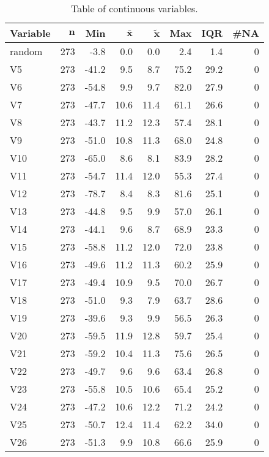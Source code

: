{\footnotesize
\begin{longtable}{lrrrrrrr}
\caption{Table of continuous variables.} \\ 
 \textbf{Variable} & $\mathbf{n}$ & \textbf{Min} & $\mathbf{\bar{x}}$ & $\mathbf{\widetilde{x}}$ & \textbf{Max} & \textbf{IQR} & \textbf{\#NA} \\ 
  \hline \endhead  \hline
random & 273 &  -3.8 &  0.0 &  0.0 &   2.4 &  1.4 & 0 \\ 
  V5 & 273 & -41.2 &  9.5 &  8.7 &  75.2 & 29.2 & 0 \\ 
  V6 & 273 & -54.8 &  9.9 &  9.7 &  82.0 & 27.9 & 0 \\ 
  V7 & 273 & -47.7 & 10.6 & 11.4 &  61.1 & 26.6 & 0 \\ 
  V8 & 273 & -43.7 & 11.2 & 12.3 &  57.4 & 28.1 & 0 \\ 
  V9 & 273 & -51.0 & 10.8 & 11.3 &  68.0 & 24.8 & 0 \\ 
  V10 & 273 & -65.0 &  8.6 &  8.1 &  83.9 & 28.2 & 0 \\ 
  V11 & 273 & -54.7 & 11.4 & 12.0 &  55.3 & 27.4 & 0 \\ 
  V12 & 273 & -78.7 &  8.4 &  8.3 &  81.6 & 25.1 & 0 \\ 
  V13 & 273 & -44.8 &  9.5 &  9.9 &  57.0 & 26.1 & 0 \\ 
  V14 & 273 & -44.1 &  9.6 &  8.7 &  68.9 & 23.3 & 0 \\ 
  V15 & 273 & -58.8 & 11.2 & 12.0 &  72.0 & 23.8 & 0 \\ 
  V16 & 273 & -49.6 & 11.2 & 11.3 &  60.2 & 25.9 & 0 \\ 
  V17 & 273 & -49.4 & 10.9 &  9.5 &  70.0 & 26.7 & 0 \\ 
  V18 & 273 & -51.0 &  9.3 &  7.9 &  63.7 & 28.6 & 0 \\ 
  V19 & 273 & -39.6 &  9.3 &  9.9 &  56.5 & 26.3 & 0 \\ 
  V20 & 273 & -59.5 & 11.9 & 12.8 &  59.7 & 25.4 & 0 \\ 
  V21 & 273 & -59.2 & 10.4 & 11.3 &  75.6 & 26.5 & 0 \\ 
  V22 & 273 & -49.7 &  9.6 &  9.6 &  63.4 & 26.8 & 0 \\ 
  V23 & 273 & -55.8 & 10.5 & 10.6 &  65.4 & 25.2 & 0 \\ 
  V24 & 273 & -47.2 & 10.6 & 12.2 &  71.2 & 24.2 & 0 \\ 
  V25 & 273 & -50.7 & 12.4 & 11.4 &  62.2 & 34.0 & 0 \\ 
  V26 & 273 & -51.3 &  9.9 & 10.8 &  66.6 & 25.9 & 0 \\ 

\end{longtable}}

